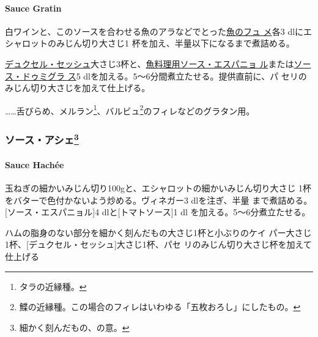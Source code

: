 \begin{recette}
\hypertarget{sauce-gratin}{%
\paragraph{Sauce Gratin}\label{sauce-gratin}}

  

白ワインと、このソースを合わせる魚のアラなどでとった\protect\hyperlink{fumet-de-poisson}{魚のフュ
メ}各3 dlにエシャロットのみじん切り大さじ1\undemi{}
杯を加え、半量以下になるまで煮詰める。

\href{}{デュクセル・セッシュ}大さじ3杯と、\protect\hyperlink{sauce-espagnole-maigre}{魚料理用ソース・エスパニョ
ル}または\protect\hyperlink{sauce-demi-glace}{ソース・ドゥミグラ ス}5
dlを加える。5〜6分間煮立たせる。提供直前に、パ
セリのみじん切り大さじ\undemi{}を加えて仕上げる。

\ldots{}\ldots{}舌びらめ、メルラン\footnote{タラの近縁種。}、バルビュ\footnote{鰈の近縁種。この場合のフィレはいわゆる「五枚おろし」にしたもの。}のフィレなどのグラタン用。

\maeaki

\hypertarget{ux30bdux30fcux30b9ux30a2ux30b7ux30a743}{%
\subsubsection[ソース・アシェ]{\texorpdfstring{ソース・アシェ\footnote{細かく刻んだもの、の意。}}{ソース・アシェ}}\label{ux30bdux30fcux30b9ux30a2ux30b7ux30a743}}

\hypertarget{sauce-hachee}{%
\paragraph{Sauce Hachée}\label{sauce-hachee}}

 

玉ねぎの細かいみじん切り100gと、エシャロットの細かいみじん切り大さじ
1\undemi{}杯をバターで色付かないよう炒める。ヴィネガー3 dlを注ぎ、半量
まで煮詰める。{[}ソース・エスパニョル{]}4
dlと{[}トマトソース{]}1\undemi{} dl を加える。5〜6分煮立たせる。

ハムの脂身のない部分を細かく刻んだもの大さじ1\undemi{}杯と小ぶりのケイ
パー大さじ1\undemi{}杯、{[}デュクセル・セッシュ{]}大さじ1\undemi{}杯、パセ
リのみじん切り大さじ\undemi{}杯を加えて仕上げる


\end{recette}
